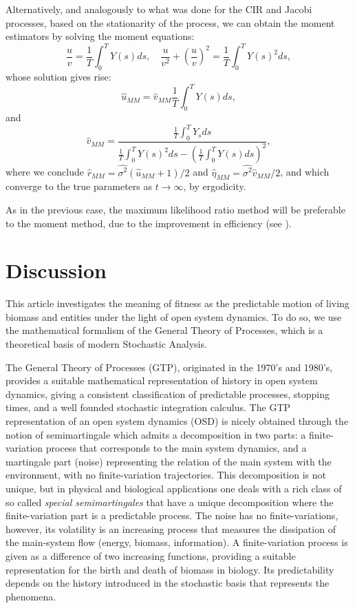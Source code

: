 \documentclass[12pt]{article}
\begin{document}
Alternatively, and analogously to what was done for the CIR and Jacobi processes, based on the stationarity of the process, we can obtain the moment estimators by solving the moment equations:
\begin{equation}\label{eq:mom-eq-gamm}
\frac{u}{v}=\frac{1}{T}\int_{0}^{T}Y(s)ds,\quad \frac{u}{v^2}+\left(\frac{u}{v}\right)^2=\frac{1}{T}\int_{0}^{T}Y(s)^2ds,
\end{equation}
whose solution gives rise:
\begin{equation}\label{eq:u-est-MM}
\hat{u}_{MM}=\hat{v}_{MM}\frac{1}{T}\int_{0}^{T}Y(s)ds,
\end{equation}
and 
\begin{equation}\label{eq:v-est-MM}
\hat{v}_{MM}=\frac{\frac{1}{T}\int_{0}^{T}Y_sds}{\frac{1}{T}\int_{0}^{T}Y(s)^2ds-\left(\frac{1}{T}\int_{0}^{T}Y(s)ds\right)^2},
\end{equation}
where we conclude $\hat{r}_{MM}=\widehat{\sigma^2}(\hat{u}_{MM}+1)/2$ and $\hat{\eta}_{MM}=\widehat{\sigma^2}\hat{v}_{MM}/2$, and which converge to the true parameters as $t\rightarrow\infty$, by ergodicity.

As in the previous case, the maximum likelihood ratio method  will be preferable to the moment method, due to the improvement in efficiency  (see \citep{kutoyants2004statistical}).

\section{Discussion}


\vskip 10pt
This article investigates the meaning of fitness as the predictable motion of living biomass and entities under the light of open system dynamics. To do so, we use the mathematical formalism of the General Theory of Processes, which is a theoretical basis of modern Stochastic Analysis. 

The General Theory of Processes (GTP), originated in the 1970's and 1980's, provides a suitable mathematical representation of history in open system dynamics, giving a consistent classification of predictable processes, stopping times, and a well founded stochastic integration calculus. The GTP representation of an open system dynamics (OSD) is nicely obtained through the notion of semimartingale which admits a decomposition in two parts: a finite-variation process that corresponds to the main system dynamics, and a martingale part (noise) representing the relation of the main system with the environment, with no finite-variation trajectories. This decomposition is not unique, but in physical and biological applications one deals with a rich class of so called \textit{special semimartingales} that have a unique decomposition where the finite-variation part is a predictable process. The noise has no finite-variations, however, its volatility is an increasing process that measures the dissipation of the main-system flow (energy, biomass, information). A finite-variation process is given as a difference of two increasing functions, providing a suitable representation for the birth and death of biomass in biology. Its predictability depends on the history introduced in the stochastic basis that represents the phenomena. 
\end{document}
